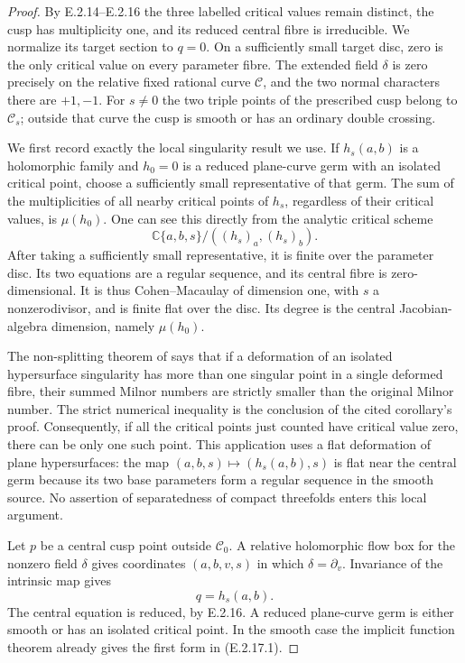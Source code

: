 \begin{proof}
By E.2.14--E.2.16 the three labelled critical
values remain distinct, the cusp has multiplicity
one, and its reduced central fibre is irreducible.
We normalize its target section to $q=0$.
On a sufficiently small target disc, zero is the
only critical value on every parameter fibre.
The extended field $\delta$ is zero precisely on
the relative fixed rational curve $\mathcal C$,
and the two normal characters there are $+1,-1$.
For $s\ne0$ the two triple points of the prescribed
cusp belong to $\mathcal C_s$; outside that curve
the cusp is smooth or has an ordinary double crossing.

We first record exactly the local singularity result
we use.  If $h_s(a,b)$ is a holomorphic family and
$h_0=0$ is a reduced plane-curve germ with an
isolated critical point, choose a sufficiently
small representative of that germ.  The sum of
the multiplicities of all nearby critical points
of $h_s$, regardless of their critical values,
is $\mu(h_0)$.  One can see this directly from
the analytic critical scheme
\[
 \mathbb C\{a,b,s\}/
       ((h_s)_a,(h_s)_b).
\]
After taking a sufficiently small representative,
it is finite over the parameter disc.  Its two
equations are a regular sequence, and its
central fibre is zero-dimensional.  It is thus
Cohen--Macaulay of dimension one, with $s$ a
nonzerodivisor, and is finite flat over the
disc.  Its degree is the central Jacobian-algebra
dimension, namely $\mu(h_0)$.

The non-splitting theorem of
\citet[Theorem 2 and its corollary, pp.~274--275]{Lazzeri1973Root}
says that if a deformation of an isolated
hypersurface singularity has more than one
singular point in a single deformed fibre,
their summed Milnor numbers are strictly
smaller than the original Milnor number.
The strict numerical inequality is the
conclusion of the cited corollary's proof.
Consequently, if all the critical points
just counted have critical value zero,
there can be only one such point.  This
application uses a flat deformation of
plane hypersurfaces: the map
$(a,b,s)\mapsto(h_s(a,b),s)$ is flat near
the central germ because its two base
parameters form a regular sequence in
the smooth source.  No assertion of
separatedness of compact threefolds enters
this local argument.

Let $p$ be a central cusp point outside
$\mathcal C_0$.  A relative holomorphic
flow box for the nonzero field $\delta$
gives coordinates $(a,b,v,s)$ in which
$\delta=\partial_v$.  Invariance of the
intrinsic map gives
\[
 q=h_s(a,b).
\]
The central equation is reduced, by
E.2.16.  A reduced plane-curve germ is
either smooth or has an isolated critical
point.  In the smooth case the implicit
function theorem already gives the first
form in (E.2.17.1).


\end{proof}
